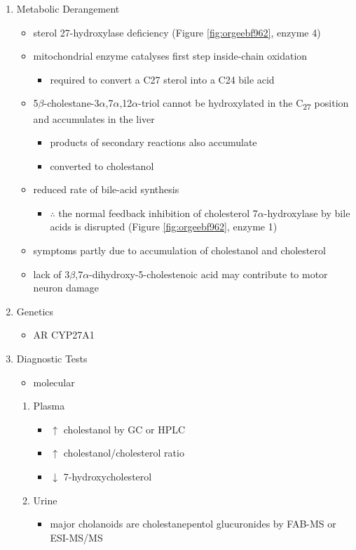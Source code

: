 \documentclass{scrartcl}
\begin{document}
\begin{enumerate}
\item Metabolic Derangement
\label{sec:org57f8812}
\begin{itemize}
\item sterol 27-hydroxylase deficiency (Figure \ref{fig:orgeebf962}, enzyme 4)
\item mitochondrial enzyme catalyses first step inside-chain oxidation
\begin{itemize}
\item required to convert a C27 sterol into a C24 bile acid
\end{itemize}
\item 5\(\beta\)-cholestane-3\(\alpha\),7\(\alpha\),12\(\alpha\)-triol cannot be hydroxylated in the C\textsubscript{27}
position and accumulates in the liver
\begin{itemize}
\item products of secondary reactions also accumulate
\item converted to cholestanol
\end{itemize}
\item reduced rate of bile-acid synthesis
\begin{itemize}
\item \(\therefore\) the normal feedback inhibition of cholesterol
7\(\alpha\)-hydroxylase by bile acids is disrupted (Figure \ref{fig:orgeebf962}, enzyme 1)
\end{itemize}
\item symptoms partly due to accumulation of cholestanol and cholesterol
\item lack of 3\(\beta\),7\(\alpha\)-dihydroxy-5-cholestenoic acid may contribute to motor
neuron damage
\end{itemize}

\item Genetics
\label{sec:org1579e6d}
\begin{itemize}
\item AR CYP27A1
\end{itemize}
\item Diagnostic Tests
\label{sec:org8fc1e9e}
\begin{itemize}
\item molecular
\end{itemize}
\begin{enumerate}
\item Plasma
\label{sec:orgab22d4e}
\begin{itemize}
\item \(\uparrow\) cholestanol by GC or HPLC
\item \(\uparrow\) cholestanol/cholesterol ratio
\item \(\downarrow\) 7-hydroxycholesterol
\end{itemize}
\item Urine
\label{sec:orgdef6a4c}
\begin{itemize}
\item major cholanoids are cholestanepentol glucuronides by FAB-MS or ESI-MS/MS
\end{itemize}
\end{enumerate}


\end{enumerate}
\end{document}
